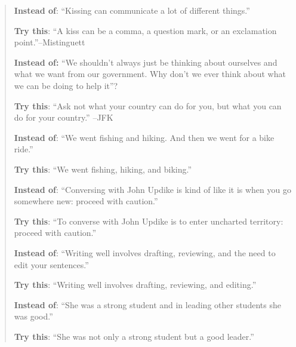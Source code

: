 \begin{quote}
\textbf{Instead of}: ``Kissing can communicate a lot of different things.''

\textbf{ Try this}: ``A kiss can be a comma, a question mark, or an exclamation 
                   point.''--Mistinguett

\textbf{Instead of:} ``We shouldn't always just be thinking about ourselves and what we want from our
                  	government. Why don't we ever think about what we can be doing to help it''?

  \textbf{	Try this}: ``Ask not what your country can do for you, but what you can do for your
                               country.'' --JFK

\textbf{Instead of}: ``We went fishing and hiking. And then we went for a bike ride.''

\textbf{	Try this}: ``We went fishing, hiking, and biking.''

\textbf{Instead of}: ``Conversing with John Updike is kind of like it is when you go somewhere new:
                    proceed with caution.''

	\textbf{Try this}: ``To converse with John Updike is to enter uncharted territory: proceed with
                              caution.''

\textbf{Instead of}:  ``Writing well involves drafting, reviewing, and the need to edit your sentences.''
 
	\textbf{Try this}: ``Writing well involves drafting, reviewing, and editing.''

\textbf{Instead of}: ``She was a strong student and in leading other students she was good.''

\textbf{Try this}: ``She was not only a strong student but a good leader.''
 \end{quote}